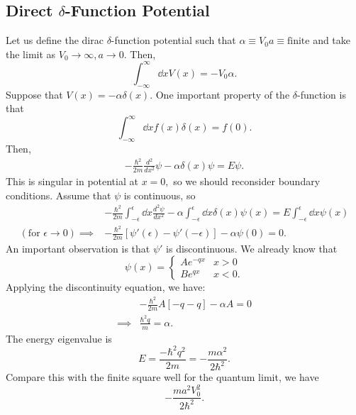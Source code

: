\documentclass{article}
\numberwithin{equation}{section}
\begin{document}
        \subsection{Direct \texorpdfstring{$\delta$}{delta}-Function Potential}
        Let us define the dirac $\delta$-function potential such that $\alpha \equiv V_0a \equiv \text{finite}$ and take the limit as $V_0 \to \infty,a\to 0.$ Then,
        \begin{equation*}
            \int_{-\infty}^{\infty} \dd{x} V(x) = -V_0\alpha.
        \end{equation*} 
        Suppose that $V(x) = -\alpha \delta (x).$ One important property of the $\delta$-function is that 
        \begin{equation*}
            \int_{-\infty}^{\infty} \dd{x} f(x)\delta(x) = f(0).
        \end{equation*}
        Then,
        \begin{align*}
            -\frac{\hbar^2}{2m}\frac{d^2}{dx^2}\psi - \alpha \delta(x) \psi = E\psi.
        \end{align*}
        This is singular in potential at $x=0,$ so we should reconsider boundary conditions. Assume that $\psi$ is continuous, so 
        \begin{align*}
            & -\frac{\hbar^2}{2m} \int_{-\epsilon}^{\epsilon} \dd{x} \frac{d^2\psi}{dx^2} - \alpha \int_{-\epsilon}^{\epsilon}\dd{x} \delta(x) \psi(x) = E\int_{-\epsilon}^{\epsilon}\dd{x} \psi(x) \\ 
            (\text{for } \epsilon \to 0) \implies & -\frac{\hbar^2}{2m}\left[\psi'(\epsilon) - \psi'(-\epsilon)\right] - \alpha\psi(0) = 0.
        \end{align*}
        An important observation is that $\psi'$ is discontinuous. We already know that 
        \begin{equation*}
            \psi(x) = \begin{cases}
                Ae^{-qx} & x> 0 \\ 
                Be^{qx} & x< 0.
            \end{cases}
        \end{equation*}
        Applying the discontinuity equation, we have:
        \begin{align*}
            & -\frac{\hbar^2}{2m}A[-q-q] - \alpha A = 0 \\ 
\implies & \frac{\hbar^2q}{m}=\alpha.
        \end{align*}
        The energy eigenvalue is 
        \begin{equation*}
            E = \frac{-\hbar^2q^2}{2m} = -\frac{m\alpha^2}{2\hbar^2}.
        \end{equation*}
        Compare this with the finite square well for the quantum limit, we have 
        \begin{equation*}
            -\frac{ma^2V_0^2}{2\hbar^2}.
        \end{equation*}
\end{document}
